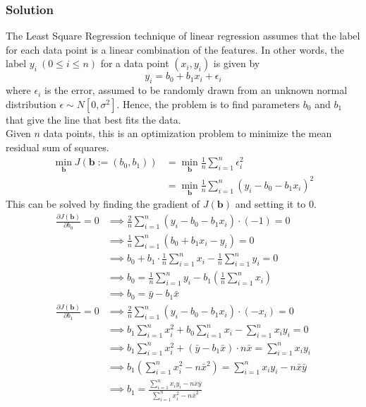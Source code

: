 \documentclass[12pt]{article}
\begin{document}
    \subsubsection*{Solution}
    The Least Square Regression technique of linear regression assumes that the label for each data point is a linear combination
    of the features. In other words, the label $y_{i} \ (0 \leq i \leq n)$ for a data point $(x_{i}, y_{i})$ is given by
    \begin{equation}
        y_{i} = b_{0} + b_{1} x_{i} + \epsilon_{i}
    \end{equation}
    where $\epsilon_{i}$ is the error, assumed to be randomly drawn from an unknown normal distribution $\epsilon \sim N[0, \sigma^{2}]$.
    Hence, the problem is to find parameters $b_{0}$ and $b_{1}$ that give the line that best fits the data.
    \vspace*{5pt} \\
    Given $n$ data points, this is an optimization problem to minimize the mean residual sum of squares.
    \begin{align}
        \min_{\mathbf{b}} J(\mathbf{b} := (b_{0}, b_{1})) &= \min_{\mathbf{b}} \frac{1}{n} \sum_{i=1}^{n} \epsilon_{i}^{2} \\
        &= \min_{\mathbf{b}} \frac{1}{n} \sum_{i=1}^{n} (y_{i} - b_{0} - b_{1} x_{i})^{2}
    \end{align}
    This can be solved by finding the gradient of $J(\mathbf{b})$ and setting it to $0$.
    \begin{align}
        \frac{\partial J(\mathbf{b})}{\partial b_{0}} = 0
        &\implies \frac{2}{n} \sum_{i=1}^{n} (y_{i} - b_{0} - b_{1} x_{i}) \cdot (-1) = 0 \\
        &\implies \frac{1}{n} \sum_{i=1}^{n} (b_{0} + b_{1} x_{i} - y_{i}) = 0 \\
        &\implies b_{0} + b_{1} \cdot \frac{1}{n} \sum_{i=1}^{n} x_{i} - \frac{1}{n} \sum_{i=1}^{n} y_{i} = 0 \\
        &\implies b_{0} = \frac{1}{n} \sum_{i=1}^{n} y_{i} - b_{1} \left( \frac{1}{n} \sum_{i=1}^{n} x_{i} \right) \\
        &\implies b_{0} = \bar{y} - b_{1} \bar{x}
        \\[15pt]
        \frac{\partial J(\mathbf{b})}{\partial b_{1}} = 0
        &\implies \frac{2}{n} \sum_{i=1}^{n} (y_{i} - b_{0} - b_{1} x_{i}) \cdot (-x_{i}) = 0 \\
        &\implies b_{1} \sum_{i=1}^{n} x_{i}^{2} + b_{0} \sum_{i=1}^{n} x_{i} - \sum_{i=1}^{n} x_{i} y_{i} = 0 \\
        &\implies b_{1} \sum_{i=1}^{n} x_{i}^{2} + (\bar{y} - b_{1} \bar{x}) \cdot n \bar{x} = \sum_{i=1}^{n} x_{i} y_{i} \\
        &\implies b_{1} \left( \sum_{i=1}^{n} x_{i}^{2} - n \bar{x}^{2} \right) = \sum_{i=1}^{n} x_{i} y_{i} - n \bar{x} \bar{y} \\
        &\implies b_{1} = \frac{\sum_{i=1}^{n} x_{i} y_{i} - n \bar{x} \bar{y}}{\sum_{i=1}^{n} x_{i}^{2} - n \bar{x}^{2}}
    \end{align}
\end{document}
